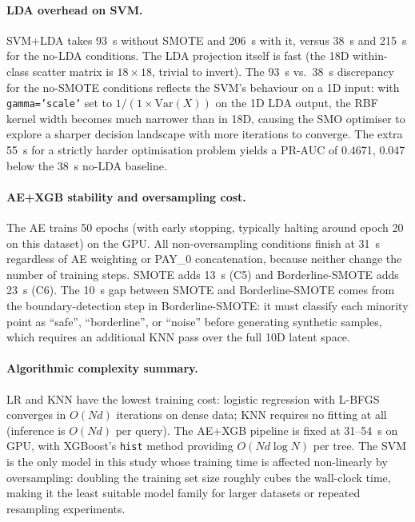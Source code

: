 \documentclass[12pt,a4paper]{article}
\begin{document}
\paragraph{LDA overhead on SVM.}
SVM+LDA takes 93~s without SMOTE and 206~s with it, versus 38~s and 215~s
for the no-LDA conditions. The LDA projection itself is fast (the 18D
within-class scatter matrix is $18 \times 18$, trivial to invert). The
93~s vs.\ 38~s discrepancy for the no-SMOTE conditions reflects the SVM's
behaviour on a 1D input: with \texttt{gamma='scale'} set to
$1 / (1 \times \mathrm{Var}(X))$ on the 1D LDA output, the RBF kernel
width becomes much narrower than in 18D, causing the SMO optimiser to
explore a sharper decision landscape with more iterations to converge.
The extra 55~s for a strictly harder optimisation problem yields a
PR-AUC of 0.4671, 0.047 below the 38~s no-LDA baseline.

\paragraph{AE+XGB stability and oversampling cost.}
The AE trains 50 epochs (with early stopping, typically halting around
epoch 20 on this dataset) on the GPU. All non-oversampling conditions finish
at 31~s regardless of AE weighting or PAY\_0 concatenation, because neither
change the number of training steps. SMOTE adds 13~s (C5) and
Borderline-SMOTE adds 23~s (C6). The 10~s gap between SMOTE and
Borderline-SMOTE comes from the boundary-detection step in Borderline-SMOTE:
it must classify each minority point as ``safe'', ``borderline'', or
``noise'' before generating synthetic samples, which requires an additional
KNN pass over the full 10D latent space.

\paragraph{Algorithmic complexity summary.}
LR and KNN have the lowest training cost: logistic regression with L-BFGS
converges in $O(N d)$ iterations on dense data; KNN requires no fitting at
all (inference is $O(N d)$ per query). The AE+XGB pipeline is fixed at
31--54~s on GPU, with XGBoost's \texttt{hist} method providing
$O(N d \log N)$ per tree. The SVM is the only model in this study
whose training time is affected non-linearly by oversampling: doubling the
training set size roughly cubes the wall-clock time, making it the least
suitable model family for larger datasets or repeated resampling experiments.
\end{document}
